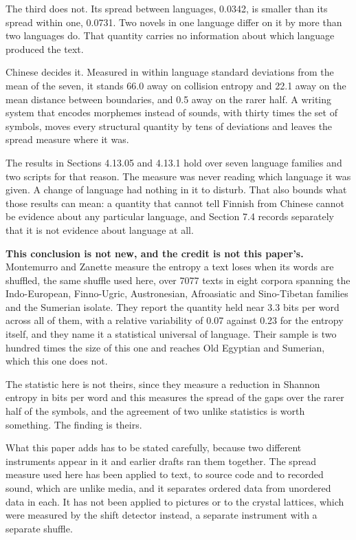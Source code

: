 The third does not. Its spread between languages, 0.0342, is smaller than its spread within one, 0.0731. Two novels in one language differ on it by more than two languages do. That quantity carries no information about which language produced the text.

Chinese decides it. Measured in within language standard deviations from the mean of the seven, it stands 66.0 away on collision entropy and 22.1 away on the mean distance between boundaries, and 0.5 away on the rarer half. A writing system that encodes morphemes instead of sounds, with thirty times the set of symbols, moves every structural quantity by tens of deviations and leaves the spread measure where it was.

The results in Sections 4.13.05 and 4.13.1 hold over seven language families and two scripts for that reason. The measure was never reading which language it was given. A change of language had nothing in it to disturb. That also bounds what those results can mean: a quantity that cannot tell Finnish from Chinese cannot be evidence about any particular language, and Section 7.4 records separately that it is not evidence about language at all.

\noindent\textbf{This conclusion is not new, and the credit is not this paper's.} Montemurro and Zanette \cite{src:Montemurro, src:Zanette} measure the entropy a text loses when its words are shuffled, the same shuffle used here, over 7077 texts in eight corpora spanning the Indo-European, Finno-Ugric, Austronesian, Afroasiatic and Sino-Tibetan families and the Sumerian isolate. They report the quantity held near 3.3 bits per word across all of them, with a relative variability of 0.07 against 0.23 for the entropy itself, and they name it a statistical universal of language. Their sample is two hundred times the size of this one and reaches Old Egyptian and Sumerian, which this one does not.

The statistic here is not theirs, since they measure a reduction in Shannon entropy in bits per word and this measures the spread of the gaps over the rarer half of the symbols, and the agreement of two unlike statistics is worth something. The finding is theirs.

What this paper adds has to be stated carefully, because two different instruments appear in it and earlier drafts ran them together. The spread measure used here has been applied to text, to source code and to recorded sound, which are unlike media, and it separates ordered data from unordered data in each. It has not been applied to pictures or to the crystal lattices, which were measured by the shift detector instead, a separate instrument with a separate shuffle.

